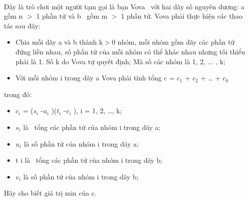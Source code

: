  

Đây là trò chơi một người tạm gọi là bạn Vova  với hai dãy số nguyên dương: a gồm n $>$ 1 phần tử và b  gồm m $>$ 1 phần tử. Vova phải thực hiện các thao tác sau đây:
\begin{itemize}
	\item Chia mỗi dãy a và b thành k$>$0 nhóm, mỗi nhóm gồm dãy các phần tử đứng liền nhau, số phần tử của mỗi nhóm có thể khác nhau nhưng tối thiểu phải là 1. Số k do Vova tự quyết định; Mã số các nhóm là 1, 2, ... , k;
	\item Với mỗi nhóm i trong dãy a Vova phải tính tổng c = $c_{1}$ + $c_{2}$ + … + $c_{k}$
\end{itemize}

trong đó:
\begin{itemize}
	\item $c_{i}$ = ($s_{i}$ -$u_{i}$ )($t_{i}$ -$v_{i}$ ), i = 1, 2, …, k;
	\item $s_{i}$ là  tổng các phần tử của nhóm i trong dãy a;
	\item $u_{i}$ là số phần tử của nhóm i trong dãy a;
	\item t i là  tổng các phần tử của nhóm i trong dãy b;
	\item $v_{i}$ là số phần tử của nhóm i trong dãy b;
\end{itemize}

Hãy cho biết giá trị min của c.